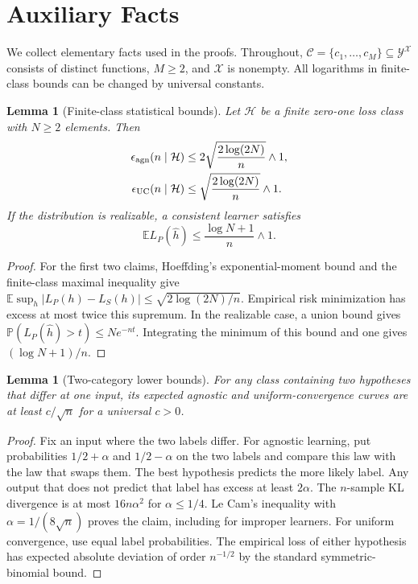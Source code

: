 \documentclass[twoside]{article}
\newtheorem{lemma}[theorem]{Lemma}
\newcommand{\E}{\mathbb E}
\newcommand{\Pp}{\mathbb P}
\newcommand{\C}{\mathcal C}
\begin{document}
\runningauthor{}

\appendix
\section{Auxiliary Facts}
\label{app:aux}

We collect elementary facts used in the proofs. Throughout, $\C=\{c_1,\ldots,c_M\}\subseteq\mathcal Y^{\mathcal X}$ consists of distinct functions, $M\geq2$, and $\mathcal X$ is nonempty. All logarithms in finite-class bounds can be changed by universal constants.

\begin{lemma}[Finite-class statistical bounds]
\label{lem:finite}
Let $\mathcal H$ be a finite zero-one loss class with $N\geq2$ elements. Then
\begin{align*}
 \epsilon_{\rm agn}(n\mid\mathcal H)&\leq 2\sqrt{\frac{2\log(2N)}{n}}\wedge1,\\
 \epsilon_{\rm UC}(n\mid\mathcal H)&\leq \sqrt{\frac{2\log(2N)}{n}}\wedge1.
\end{align*}
If the distribution is realizable, a consistent learner satisfies
\[
 \E L_P(\widehat h)\leq\frac{\log N+1}{n}\wedge1.
\]
\end{lemma}

\begin{proof}
For the first two claims, Hoeffding's exponential-moment bound and the finite-class maximal inequality give $\E\sup_h|L_P(h)-L_S(h)|\leq\sqrt{2\log(2N)/n}$. Empirical risk minimization has excess at most twice this supremum. In the realizable case, a union bound gives $\Pp(L_P(\widehat h)>t)\leq N e^{-nt}$. Integrating the minimum of this bound and one gives $(\log N+1)/n$.
\end{proof}

\begin{lemma}[Two-category lower bounds]
\label{lem:two-category}
For any class containing two hypotheses that differ at one input, its expected agnostic and uniform-convergence curves are at least $c/\sqrt n$ for a universal $c>0$.
\end{lemma}

\begin{proof}
Fix an input where the two labels differ. For agnostic learning, put probabilities $1/2+\alpha$ and $1/2-\alpha$ on the two labels and compare this law with the law that swaps them. The best hypothesis predicts the more likely label. Any output that does not predict that label has excess at least $2\alpha$. The $n$-sample KL divergence is at most $16n\alpha^2$ for $\alpha\leq1/4$. Le Cam's inequality with $\alpha=1/(8\sqrt n)$ proves the claim, including for improper learners. For uniform convergence, use equal label probabilities. The empirical loss of either hypothesis has expected absolute deviation of order $n^{-1/2}$ by the standard symmetric-binomial bound.
\end{proof}
\end{document}
